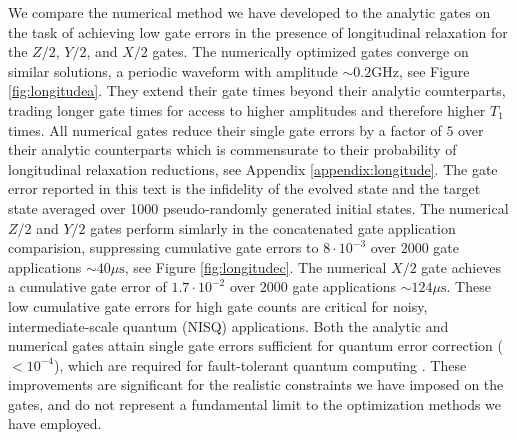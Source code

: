 We compare the numerical method we have developed to the analytic gates
on the task of achieving low gate errors in the presence of longitudinal relaxation
for the $Z/2$, $Y/2$, and $X/2$ gates.
The numerically optimized gates converge on similar solutions, a periodic
waveform with amplitude $\sim 0.2 \textrm{GHz}$, see Figure \ref{fig:longitudea}.
They extend their gate times
beyond their analytic counterparts, trading longer gate times for access
to higher amplitudes and therefore higher $T_{1}$ times. All numerical gates reduce
their single gate errors by a factor of $5$ over
their analytic counterparts which is commensurate to their
probability of longitudinal relaxation reductions, see Appendix \ref{appendix:longitude}.
The gate error reported in this text is the infidelity
of the evolved state and the target state averaged over 1000 pseudo-randomly
generated initial states. The numerical $Z/2$ and $Y/2$ gates perform simlarly in
the concatenated gate application comparision, suppressing cumulative gate errors to $8 \cdot 10^{-3}$
over $2000$ gate applications $\sim 40 \mu\textrm{s}$, see Figure \ref{fig:longitudec}.
The numerical $X/2$ gate achieves a cumulative gate error of
$1.7 \cdot 10^{-2}$ over $2000$ gate applications $\sim 124 \mu\textrm{s}$.
These low cumulative gate errors for high gate counts are critical for
noisy, intermediate-scale quantum (NISQ) applications.
Both the analytic and numerical gates attain single gate errors sufficient for
quantum error correction ($< 10^{-4}$), which are required for fault-tolerant quantum computing
\cite{aharonov2008fault, fowler2009high, gottesman1997stabilizer}.
These improvements are significant for the realistic constraints we have imposed
on the gates, and do not represent a fundamental limit to the optimization methods we have
employed.

